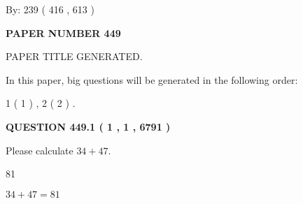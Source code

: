\documentclass[12pt]{article}
\begin{document}
   
\hspace{1.0in} By: 
 239 ( 416 ,  613 )
   
   
   
   
\newpage 
\setcounter{page}{ 
   449001 } 
   
   
   
   
 {\textbf{ \Large{ PAPER NUMBER  449  }}}
   
   
\vspace{0.2in}
   
   
   
   
   
   
   
   
 \vspace{0.2in}
 
 
 
 
   
   
 PAPER TITLE GENERATED.
   
   
   
\vspace{0.2in}
   
In this paper, big questions will be generated in the following order: 
   
   
   1 ( 1 )
 ,
   2 ( 2 )
 .
  
\vspace{0.2in}
  
{\textbf{\Large{QUESTION
449.1 
 ( 1 , 1 , 6791 )
}}}
  
  
 
Please calculate $ %
34 +  %
47 $.
 
 
 
\noindent{}
 
 

81
 
 
\noindent{}
 
 

 
 
 
\noindent{}
 
 

$ %
34 +  %
47=   %
81$
 
 
\noindent{}
 
\end{document}
